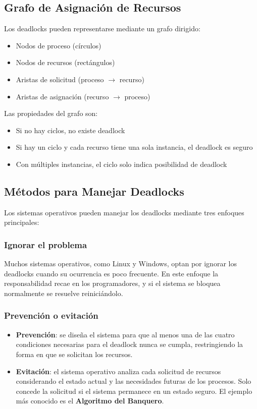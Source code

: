 \documentclass[12pt,letterpaper]{article}
\begin{document}
\subsection*{Grafo de Asignación de Recursos}

Los deadlocks pueden representarse mediante un grafo dirigido:

\begin{itemize}
\item Nodos de proceso (círculos)
\item Nodos de recursos (rectángulos)
\item Aristas de solicitud (proceso $\rightarrow$ recurso)
\item Aristas de asignación (recurso $\rightarrow$ proceso)
\end{itemize}

\noindent
Las propiedades del grafo son:

\begin{itemize}
\item Si no hay ciclos, no existe deadlock
\item Si hay un ciclo y cada recurso tiene una sola instancia, el deadlock es seguro
\item Con múltiples instancias, el ciclo solo indica posibilidad de deadlock
\end{itemize}

\subsection*{Métodos para Manejar Deadlocks}

Los sistemas operativos pueden manejar los deadlocks mediante tres enfoques principales:

\subsubsection*{Ignorar el problema}

Muchos sistemas operativos, como Linux y Windows, optan por ignorar los deadlocks cuando su ocurrencia es poco frecuente. En este enfoque la responsabilidad recae en los programadores, y si el sistema se bloquea normalmente se resuelve reiniciándolo.

\subsubsection*{Prevención o evitación}

\begin{itemize}
\item \textbf{Prevención}: se diseña el sistema para que al menos una de las cuatro condiciones necesarias para el deadlock nunca se cumpla, restringiendo la forma en que se solicitan los recursos.
  
\item \textbf{Evitación}: el sistema operativo analiza cada solicitud de recursos considerando el estado actual y las necesidades futuras de los procesos. Solo concede la solicitud si el sistema permanece en un estado seguro. El ejemplo más conocido es el \textbf{Algoritmo del Banquero}.
\end{itemize}
\end{document}

